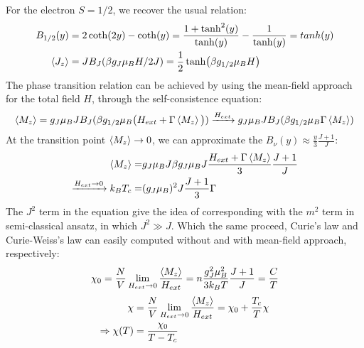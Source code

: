 \documentclass[a4paper]{article}
\begin{document}
For the electron \(S = 1/2\), we recover the usual relation:
\begin{align*}
	B_{1/2}(y) &= 2\coth(2y) - \coth(y) = \frac{1 + \tanh^2 (y) }{\tanh(y)} - \frac{1}{\tanh(y)} = tanh(y) \\
	\ev{J_z} &= J B_{J}(\beta g_J \mu_B H /2J) = \frac{1}{2} \tanh (\beta g_{1/2} \mu_B H)	
\end{align*}
The phase transition relation can be achieved by using the mean-field approach for the total field \(H\), through the self-consistence equation:
\begin{equation}
	\ev{M_z} = g_J \mu_B J B_{J}(\beta g_{1/2} \mu_B \big(H_{ext} + \Gamma \ev{M_z} \big)) \xrightarrow{H_{ext}} g_J \mu_B J B_{J}(\beta g_{1/2} \mu_B\Gamma \ev{M_z})
\end{equation}
At the transition point \(\ev{M_z} \to 0\), we can approximate the \(B_{\nu}(y) \approx \frac{y}{3} \frac{J + 1}{J}\):
\begin{align}
	\ev{M_z} =& g_J \mu_B J \beta g_{J} \mu_B J\frac{H_{ext} + \Gamma \ev{M_z}}{3} \frac{J + 1}{J}\nonumber\\
	\xrightarrow{H_{ext} \to 0}k_B T_c =&  (g_J \mu_B)^2 J\frac{J + 1}{3} \Gamma
\end{align}
\quad The \(J^2\) term in the equation give the idea of corresponding with the \(m^2\) term in semi-classical ansatz, in which \(J^2 \gg J\). Which the same proceed, Curie's law and Curie-Weiss's law can easily computed without and with mean-field approach, respectively:
\begin{equation}
	\chi_0 = \frac{N}{V}\lim_{H_{ext} \to 0} \frac{\ev{M_z}}{H_{ext}} = n\frac{g_J^2 \mu_B^2 }{3k_B T} \frac{J+1}{J} = \frac{C}{T}
\end{equation}
\begin{align*}
	\chi &= \frac{N}{V} \lim_{H_{ext} \to 0} \frac{\ev{M_z}}{H_{ext}} = \chi_0 + \frac{T_c}{T} \chi\\
	\Rightarrow \chi(T) &= \frac{\chi_0}{T - T_c}
\end{align*}
\end{document}
